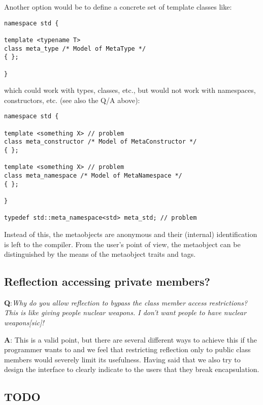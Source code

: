 Another option would be to define a concrete set of template classes like:

\begin{verbatim}
namespace std {

template <typename T>
class meta_type /* Model of MetaType */
{ };

}
\end{verbatim}

which could work with types, classes, etc., but would not work with namespaces,
constructors, etc. (see also the Q/A above):

\begin{verbatim}
namespace std {

template <something X> // problem
class meta_constructor /* Model of MetaConstructor */
{ };

template <something X> // problem
class meta_namespace /* Model of MetaNamespace */
{ };

}

typedef std::meta_namespace<std> meta_std; // problem
\end{verbatim}

Instead of this, the metaobjects are anonymous and their (internal) identification
is left to the compiler. From the user's point of view, the metaobject can be distinguished
by the means of the metaobject traits and tags.

\subsection{Reflection accessing private members?}

{\textbf Q:}{\em Why do you allow reflection to bypass the class member access
restrictions? This is like giving people nuclear weapons. I don't want people
to have nuclear weapons[sic]!}

{\textbf A:}
This is a valid point, but there are several different ways to achieve this
if the programmer wants to and we feel that restricting reflection only to public
class members would severely limit its usefulness. Having said that we also
try to design the interface to clearly indicate to the users that they break
encapsulation.

\subsection{TODO}
